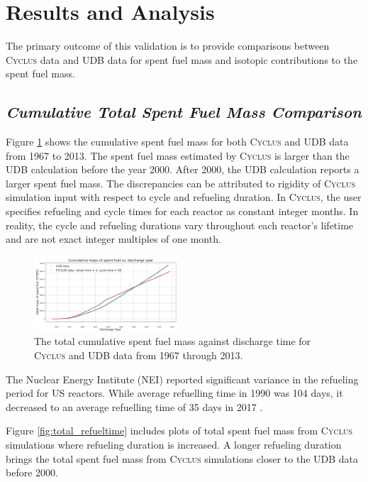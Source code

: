 \documentclass{anstrans}
\newcommand{\Cyclus}{\textsc{Cyclus}\xspace}%
\begin{document}
\section{Results and Analysis}
The primary outcome of this validation is to provide comparisons between 
\Cyclus data and UDB data for spent fuel mass and isotopic contributions to the 
spent fuel mass. 

\subsection{\textit{Cumulative Total Spent Fuel Mass Comparison}}
Figure \ref{fig:total_original} shows the cumulative spent fuel mass for both 
\Cyclus and UDB data from 1967 to 2013. The spent fuel mass estimated by 
\Cyclus is larger than the UDB calculation before the year 2000. After 2000,
the UDB calculation reports a larger spent fuel mass. The discrepancies can be 
attributed to rigidity of \Cyclus simulation input with respect to cycle and 
refueling duration. In \Cyclus, the user specifies refueling and cycle times for each 
reactor as constant integer months.  In reality, the cycle and refueling durations 
vary throughout each reactor's lifetime and are not exact integer multiples of 
one month. 

\begin{figure}[t] %
	\centering
	\includegraphics[width=0.48\textwidth]{figures/total_cumulative_mass_spent_fuel_original}
	\caption{The total cumulative spent fuel mass against discharge time for \Cyclus and UDB data from 1967 through 2013.}
	\label{fig:total_original}
\end{figure}

The Nuclear Energy Institute (NEI) reported significant 
variance in the refueling period for US reactors. While average 
refuelling time in 1990 was 104 days, it decreased to an average 
refuelling time of 35 days in 2017 \cite{iaea_current_nodate}.

Figure \ref{fig:total_refueltime} includes plots of total spent fuel mass from 
\Cyclus simulations where refueling duration is increased. A longer refueling duration brings 
the total spent fuel mass from \Cyclus simulations closer to the UDB data 
before 2000. 
\end{document}
